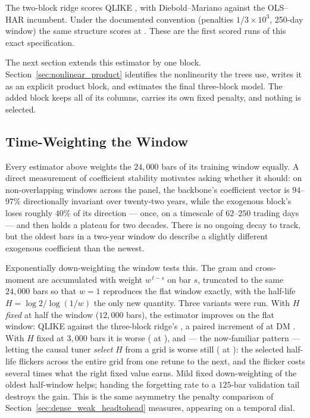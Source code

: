 The two-block ridge scores QLIKE \unifBlkTwoUserQLIKE{}, with
Diebold--Mariano \unifBlkTwoUserDM{} against the OLS--HAR incumbent. Under
the documented convention (penalties $1$/$3\times 10^{3}$, 250-day window)
the same structure scores \unifBlkTwoDocQLIKE{} at \unifBlkTwoDocDM{}.
These are the first scored runs of this exact specification.

The next section extends this estimator by one block.
Section~\ref{sec:nonlinear_product} identifies the
nonlinearity the trees use, writes it as an explicit product block, and
estimates the final three-block model. The added
block keeps all of its columns, carries its own
fixed penalty, and nothing is selected.

\subsection{Time-Weighting the Window}
\label{sec:dense_weak_ew}

Every estimator above weights the $24{,}000$ bars of its training window
equally. A direct measurement of coefficient stability motivates asking
whether it should: on non-overlapping windows across the panel, the
backbone's coefficient vector is $94$--$97\%$ directionally invariant
over twenty-two years, while the exogenous block's loses roughly $40\%$
of its direction --- once, on a timescale of $62$--$250$ trading days
--- and then holds a plateau for two decades. There is no ongoing decay
to track, but the oldest bars in a two-year window do describe a
slightly different exogenous coefficient than the newest.

Exponentially down-weighting the window tests this. The gram and
cross-moment are accumulated with weight $w^{\,t-s}$ on bar $s$,
truncated to the same $24{,}000$ bars so that $w = 1$ reproduces the
flat window exactly, with the half-life $H = \log 2 / \log(1/w)$ the
only new quantity. Three variants were run. With $H$ \emph{fixed} at
half the window ($12{,}000$ bars), the estimator improves on the flat
window: QLIKE \unifBlkThreeEwFixedHTwelveKQLIKE{} against the
three-block ridge's \unifBlkThreeTunedQLIKE{}, a paired increment of
\unifIncrBlkThreeEwFixedHTwelveKDQ{} at DM
\unifIncrBlkThreeEwFixedHTwelveKDM{}. With $H$ fixed at $3{,}000$ bars
it is worse (\unifIncrBlkThreeEwFixedHThreeKDQ{} at
\unifIncrBlkThreeEwFixedHThreeKDM{}), and --- the now-familiar pattern
--- letting the causal tuner \emph{select} $H$ from a grid is worse
still (\unifIncrBlkThreeEwTunedDQ{} at \unifIncrBlkThreeEwTunedDM{}):
the selected half-life flickers across the entire grid from one retune
to the next, and the flicker costs several times what the right fixed
value earns. Mild fixed down-weighting of the oldest half-window helps;
handing the forgetting rate to a $125$-bar validation tail destroys the
gain. This is the same asymmetry the penalty comparison of
Section~\ref{sec:dense_weak_headtohead} measures, appearing on a
temporal dial.


